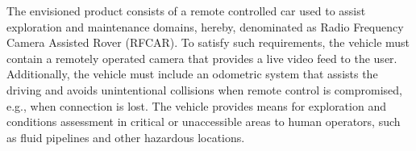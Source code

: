 The envisioned product consists of a remote controlled car used to assist
exploration and maintenance domains, hereby, denominated as Radio Frequency
Camera Assisted Rover (RFCAR). To satisfy such requirements, the vehicle must
contain a remotely operated camera that provides a live video feed to the user.
Additionally, the vehicle must include an odometric system that assists the
driving and avoids unintentional collisions when remote control is compromised, e.g., when connection is lost.
The vehicle provides means for exploration and conditions assessment in critical
or unaccessible areas to human operators, such as fluid pipelines and other hazardous locations.
%
